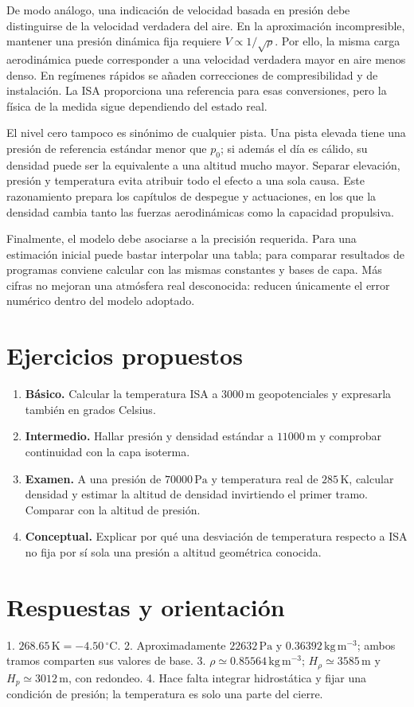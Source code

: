 De modo análogo, una indicación de velocidad basada en presión debe distinguirse de la velocidad verdadera del aire. En la aproximación incompresible, mantener una presión dinámica fija requiere $V\propto1/\sqrt{\rho}$. Por ello, la misma carga aerodinámica puede corresponder a una velocidad verdadera mayor en aire menos denso. En regímenes rápidos se añaden correcciones de compresibilidad y de instalación. La ISA proporciona una referencia para esas conversiones, pero la física de la medida sigue dependiendo del estado real.

El nivel cero tampoco es sinónimo de cualquier pista. Una pista elevada tiene una presión de referencia estándar menor que $p_0$; si además el día es cálido, su densidad puede ser la equivalente a una altitud mucho mayor. Separar elevación, presión y temperatura evita atribuir todo el efecto a una sola causa. Este razonamiento prepara los capítulos de despegue y actuaciones, en los que la densidad cambia tanto las fuerzas aerodinámicas como la capacidad propulsiva.

Finalmente, el modelo debe asociarse a la precisión requerida. Para una estimación inicial puede bastar interpolar una tabla; para comparar resultados de programas conviene calcular con las mismas constantes y bases de capa. Más cifras no mejoran una atmósfera real desconocida: reducen únicamente el error numérico dentro del modelo adoptado.

\section{Ejercicios propuestos}
\begin{enumerate}
\item \textbf{Básico.} Calcular la temperatura ISA a $3000\,\mathrm{m}$ geopotenciales y expresarla también en grados Celsius.
\item \textbf{Intermedio.} Hallar presión y densidad estándar a $11000\,\mathrm{m}$ y comprobar continuidad con la capa isoterma.
\item \textbf{Examen.} A una presión de $70000\,\mathrm{Pa}$ y temperatura real de $285\,\mathrm{K}$, calcular densidad y estimar la altitud de densidad invirtiendo el primer tramo. Comparar con la altitud de presión.
\item \textbf{Conceptual.} Explicar por qué una desviación de temperatura respecto a ISA no fija por sí sola una presión a altitud geométrica conocida.
\end{enumerate}
\section{Respuestas y orientación}
1. $268.65\,\mathrm{K}=-4.50\,{}^\circ\mathrm{C}$. 2. Aproximadamente $22632\,\mathrm{Pa}$ y $0.36392\,\mathrm{kg\,m^{-3}}$; ambos tramos comparten sus valores de base. 3. $\rho\simeq0.85564\,\mathrm{kg\,m^{-3}}$; $H_\rho\simeq3585\,\mathrm{m}$ y $H_p\simeq3012\,\mathrm{m}$, con redondeo. 4. Hace falta integrar hidrostática y fijar una condición de presión; la temperatura es solo una parte del cierre.

